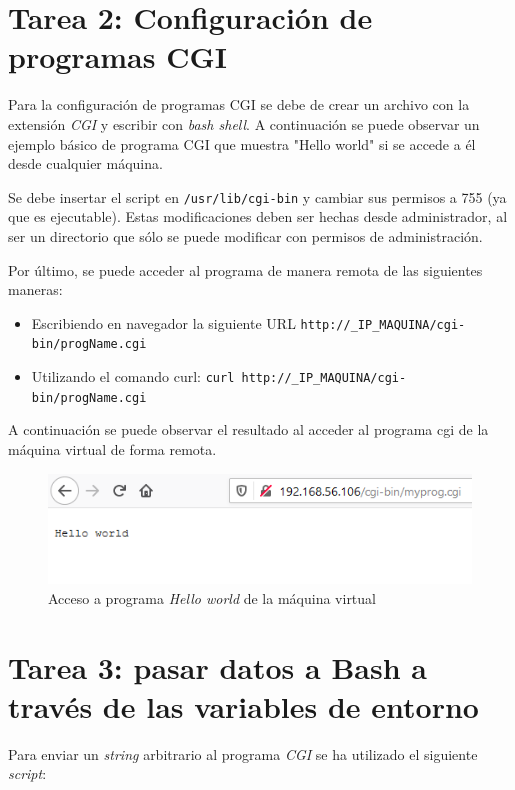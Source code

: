 \documentclass[10pt,a4paper]{article}
\begin{document}
\section{Tarea 2: Configuración de programas CGI}

Para la configuración de programas CGI se debe de crear un archivo con la extensión \emph{CGI} y escribir con \emph{bash shell}.
A continuación se puede observar un ejemplo básico de programa CGI que muestra "Hello world" si se accede a él desde cualquier máquina.
 

Se debe insertar el script en \texttt{/usr/lib/cgi-bin} y cambiar sus permisos a 755 (ya que es ejecutable). Estas modificaciones deben ser hechas desde administrador, al ser un directorio que sólo se puede modificar con permisos de administración. 

Por último, se puede acceder al programa de manera remota de las siguientes maneras: 
\begin{itemize}
	\item Escribiendo en navegador la siguiente URL \texttt{http://\_{}IP\_{}MAQUINA/cgi-bin/progName.cgi}
	\item Utilizando el comando curl: \texttt{curl http://\_{}IP\_{}MAQUINA/cgi-bin/progName.cgi}
\end{itemize}

A continuación se puede observar el resultado al acceder al programa cgi de la máquina virtual de forma remota.
\begin{figure}[h!]
	\centering
	\includegraphics[scale=0.6]{images/Tarea_2.png}
	\caption{Acceso a programa \emph{Hello world} de la máquina virtual }
	\label{fig:tarea2_hello_world} 
\end{figure}
\section{Tarea 3: pasar datos a Bash a través de las variables de entorno}

Para enviar un \emph{string} arbitrario al programa \emph{CGI} se ha utilizado el siguiente \emph{script}:\\
\end{document}
